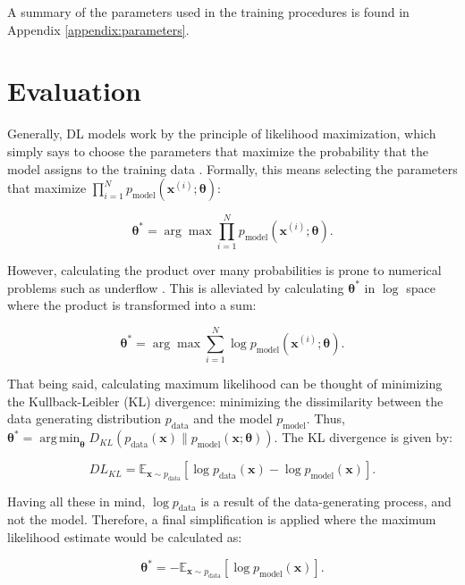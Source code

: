 \documentclass[a4paper]{book}
\DeclareMathOperator*{\argmin}{arg\,min}
\begin{document}
A summary of the parameters used in the training procedures is found in Appendix \ref{appendix:parameters}.

\section{Evaluation} \label{sec:evaluation}

Generally, DL models work by the principle of likelihood maximization, which simply says to choose the parameters that maximize the probability that the model assigns to the training data \parencite{goodfellow_nips_2016}. Formally, this means selecting the parameters that maximize $\prod_{i=1}^N p_{\text{model}}(\bm{x}^{(i)}; \bm{\theta})$:

\begin{equation}
    \bm{\theta^*} = \arg \max \prod_{i=1}^N p_{\text{model}}(\bm{x}^{(i)}; \bm{\theta}) \label{eq:og_mle}.
\end{equation}

However, calculating the product over many probabilities is prone to numerical problems such as underflow \parencite{goodfellow_nips_2016}. This is alleviated by calculating $\bm{\theta^*}$ in $\log$ space where the product is transformed into a sum:

\begin{equation}
    \bm{\theta^*} = \arg \max \sum_{i=1}^N \log p_{\text{model}}(\bm{x}^{(i)}; \bm{\theta}) \label{eg:log_mle}.
\end{equation}

That being said, calculating maximum likelihood can be thought of minimizing the Kullback-Leibler (KL) divergence: minimizing the dissimilarity between the data generating distribution $p_{\text{data}}$ and the model $p_{\text{model}}$. Thus, $\bm{\theta^*} = \argmin_{\bm{\theta}} D_{KL}(p_{\text{data}}(\bm{x}) \| p_{\text{model}} (\bm{x}; \bm{\theta}))$. The KL divergence is given by:

\begin{equation}
    DL_{KL} = \mathbb{E}_{\mathbf{x} \sim p_{\text{data}}} [\log p_{\text{data}} (\bm{x}) - \log p_{\text{model}} (\bm{x})] \label{eq:kl_div}.
\end{equation}

Having all these in mind, $\log p_{\text{data}}$ is a result of the data-generating process, and not the model. Therefore, a final simplification is applied where the maximum likelihood estimate would be calculated as:

\begin{equation}
    \bm{\theta^*} = - \mathbb{E}_{\mathbf{x} \sim p_{\text{data}}} [\log p_{\text{model}} (\bm{x})] \label{eq:nll}.
\end{equation}
\end{document}
